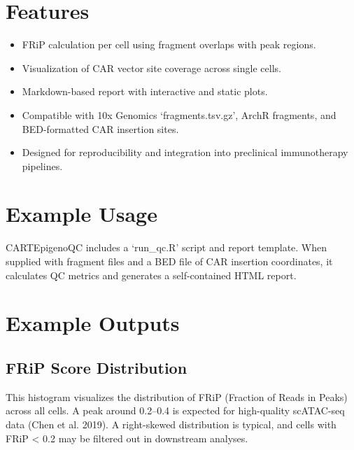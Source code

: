 \documentclass[
]{article}
\providecommand{\tightlist}{%
  \setlength{\itemsep}{0pt}\setlength{\parskip}{0pt}}
\begin{document}
\section{Features}\label{features}

\begin{itemize}
\tightlist
\item
  FRiP calculation per cell using fragment overlaps with peak regions.
\item
  Visualization of CAR vector site coverage across single cells.
\item
  Markdown-based report with interactive and static plots.
\item
  Compatible with 10x Genomics `fragments.tsv.gz', ArchR fragments, and
  BED-formatted CAR insertion sites.
\item
  Designed for reproducibility and integration into preclinical
  immunotherapy pipelines.
\end{itemize}

\section{Example Usage}\label{example-usage}

CARTEpigenoQC includes a `run\_qc.R' script and report template. When
supplied with fragment files and a BED file of CAR insertion
coordinates, it calculates QC metrics and generates a self-contained
HTML report.

\section{Example Outputs}\label{example-outputs}

\subsection{FRiP Score Distribution}\label{frip-score-distribution}

This histogram visualizes the distribution of FRiP (Fraction of Reads in
Peaks) across all cells. A peak around 0.2--0.4 is expected for
high-quality scATAC-seq data (Chen et al. 2019). A right-skewed
distribution is typical, and cells with FRiP \textless{} 0.2 may be
filtered out in downstream analyses.
\end{document}
